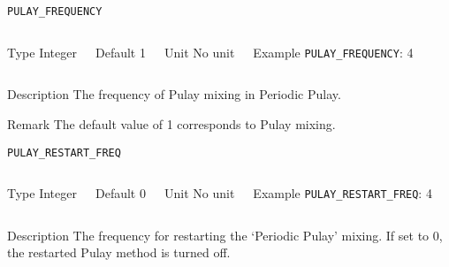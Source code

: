\documentclass[xcolor=dvipsnames,t]{beamer}
\begin{document}
\begin{frame}[allowframebreaks]{\texttt{PULAY\_FREQUENCY}} \label{PULAY_FREQUENCY}
\vspace*{-12pt}
\begin{columns}
\begin{block}{Type}
Integer
\end{block}

\begin{block}{Default}
1
\end{block}

\begin{block}{Unit}
No unit
\end{block}

\begin{block}{Example}
\texttt{PULAY\_FREQUENCY}: 4
\end{block}
\end{columns}

\begin{block}{Description}
The frequency of Pulay mixing in Periodic Pulay. 
\end{block}

\begin{block}{Remark}
The default value of 1 corresponds to Pulay mixing.
\end{block}

\end{frame}




\begin{frame}[allowframebreaks]{\texttt{PULAY\_RESTART\_FREQ}} \label{PULAY_RESTART_FREQ}
\vspace*{-12pt}
\begin{columns}
\begin{block}{Type}
Integer
\end{block}

\begin{block}{Default}
0
\end{block}

\begin{block}{Unit}
No unit
\end{block}

\begin{block}{Example}
\texttt{PULAY\_RESTART\_FREQ}: 4
\end{block}
\end{columns}

\begin{block}{Description}
The frequency for restarting the `Periodic Pulay' mixing. If set to 0, the restarted Pulay method is turned off.
\end{block}

\end{frame}
\end{document}
